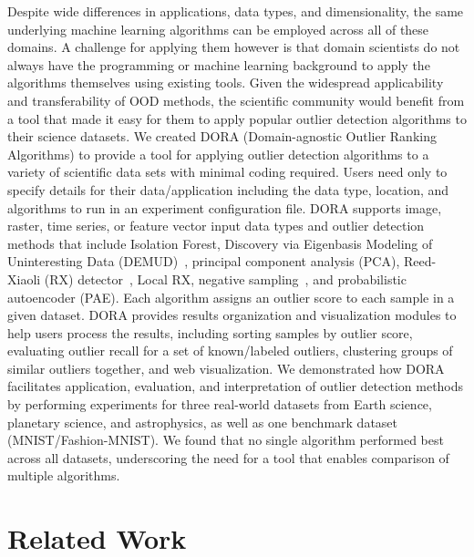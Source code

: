 \documentclass[utf8]{frontiersFPHY} %
\begin{document}
Despite wide differences in applications, data types, and dimensionality,
the same underlying machine learning algorithms can be employed across 
all of these domains. A challenge for applying them however is that domain
scientists do not always have the programming or machine learning background
to apply the algorithms themselves using existing tools. Given the widespread 
applicability and transferability of OOD methods, the scientific community 
would benefit from a tool that made it easy for them to apply popular outlier
detection algorithms to their science datasets. We created DORA 
(Domain-agnostic Outlier Ranking Algorithms) 
to provide a tool for applying outlier 
detection algorithms to a variety of scientific data sets with minimal coding
required. Users need only to specify details for their data/application 
including the data type, location, and algorithms to run in an experiment
configuration file. DORA supports image, raster, time series, 
or feature vector input data types and outlier detection methods that include
Isolation Forest, Discovery via Eigenbasis Modeling of Uninteresting Data 
(DEMUD)~\citep{wagstaff:demud13}, principal component analysis (PCA),
Reed-Xiaoli (RX) detector~\citep{reed1990adaptive},  
Local RX, negative sampling~\cite{sipple:neg-sampling20}, and probabilistic 
autoencoder (PAE). 
Each algorithm assigns an outlier 
score to each sample in a given dataset. 
DORA provides results organization and visualization 
modules to help users process the results, including sorting samples by outlier 
score, evaluating outlier recall for a set of known/labeled outliers, clustering 
groups of similar outliers together, and web visualization. 
We demonstrated how DORA
facilitates application, evaluation, and interpretation of outlier detection
methods by performing
experiments for three real-world datasets from Earth science, planetary
science, and astrophysics, as well as one benchmark dataset 
(MNIST/Fashion-MNIST). We found that no single algorithm
performed best across all datasets, underscoring the need for a tool 
that enables comparison of multiple algorithms.



\section{Related Work}
\end{document}
